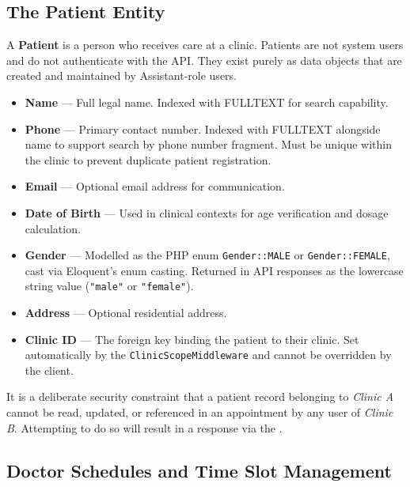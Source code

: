 \subsection{The Patient Entity}
\label{sec:domain-patients}

A \textbf{Patient} is a person who receives care at a clinic. Patients
are not system users and do not authenticate with the API. They exist
purely as data objects that are created and maintained by Assistant-role
users.

\begin{itemize}
  \item \textbf{Name} --- Full legal name. Indexed with FULLTEXT for
    search capability.
  \item \textbf{Phone} --- Primary contact number. Indexed with FULLTEXT
    alongside name to support search by phone number fragment. Must be
    unique within the clinic to prevent duplicate patient registration.
  \item \textbf{Email} --- Optional email address for communication.
  \item \textbf{Date of Birth} --- Used in clinical contexts for age
    verification and dosage calculation.
  \item \textbf{Gender} --- Modelled as the PHP enum
    \texttt{Gender::MALE} or \texttt{Gender::FEMALE}, cast via
    Eloquent's enum casting. Returned in API responses as the lowercase
    string value (\texttt{"male"} or \texttt{"female"}).
  \item \textbf{Address} --- Optional residential address.
  \item \textbf{Clinic ID} --- The foreign key binding the patient to
    their clinic. Set automatically by the \texttt{ClinicScopeMiddleware}
    and cannot be overridden by the client.
\end{itemize}

\begin{warningbox}
  It is a deliberate security constraint that a patient record belonging
  to \emph{Clinic A} cannot be read, updated, or referenced in an
  appointment by any user of \emph{Clinic B}. Attempting to do so will
  result in a \stforbid{} response via the
  .
\end{warningbox}

\subsection{Doctor Schedules and Time Slot Management}
\label{sec:domain-schedules}

